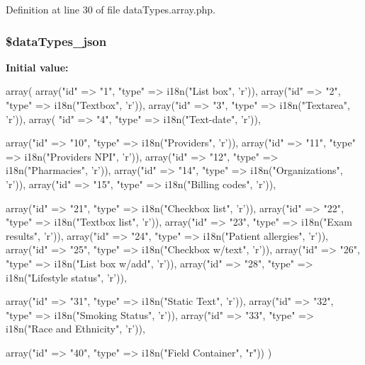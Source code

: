 \-Definition at line 30 of file data\-Types.\-array.\-php.

\hypertarget{data_types_8array_8php_a73e226d365380923fee9695a0a0804ed}{
\subsubsection[{\$data\-Types\-\_\-json}]{\setlength{\rightskip}{0pt plus 5cm}\$data\-Types\-\_\-json}}\label{data_types_8array_8php_a73e226d365380923fee9695a0a0804ed}
{\bfseries \-Initial value\-:}
\begin{DoxyCode}
 array(
        array("id"      => "1", "type" => i18n("List box", 'r')),                               
        array("id"      => "2", "type" => i18n("Textbox", 'r')),                                
        array("id"      => "3", "type"  => i18n("Textarea", 'r')),                              
        array( "id"     => "4", "type"  => i18n("Text-date", 'r')),             
        
        array("id"      => "10", "type"  => i18n("Providers", 'r')),                    
        array("id"      => "11", "type"  => i18n("Providers NPI", 'r')),                
        array("id"      => "12", "type"  => i18n("Pharmacies", 'r')),                   
        array("id"      => "14", "type"  => i18n("Organizations", 'r')),                
        array("id"      => "15", "type"  => i18n("Billing codes", 'r')),
        
        array("id"      => "21", "type"  => i18n("Checkbox list", 'r')),                
        array("id"      => "22", "type"  => i18n("Textbox list", 'r')), 
        array("id"      => "23", "type"  => i18n("Exam results", 'r')),                 
        array("id"      => "24", "type"  => i18n("Patient allergies", 'r')),    
        array("id"      => "25", "type"  => i18n("Checkbox w/text", 'r')),              
        array("id"      => "26", "type"  => i18n("List box w/add", 'r')),               
        array("id"      => "28", "type"  => i18n("Lifestyle status", 'r')),
        
        array("id"      => "31", "type"  => i18n("Static Text", 'r')),                  
        array("id"      => "32", "type"  => i18n("Smoking Status", 'r')),
        array("id"      => "33", "type"  => i18n("Race and Ethnicity", 'r')),
        
        array("id"      => "40", "type"  => i18n("Field Container", "r"))
)
\end{DoxyCode}


